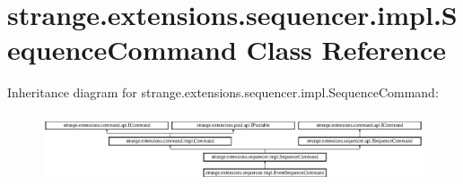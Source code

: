 \hypertarget{classstrange_1_1extensions_1_1sequencer_1_1impl_1_1_sequence_command}{\section{strange.\-extensions.\-sequencer.\-impl.\-Sequence\-Command Class Reference}
\label{classstrange_1_1extensions_1_1sequencer_1_1impl_1_1_sequence_command}
}
Inheritance diagram for strange.\-extensions.\-sequencer.\-impl.\-Sequence\-Command\-:\begin{figure}[H]
\begin{center}
\leavevmode
\includegraphics[height=2.068329cm]{classstrange_1_1extensions_1_1sequencer_1_1impl_1_1_sequence_command}
\end{center}
\end{figure}

